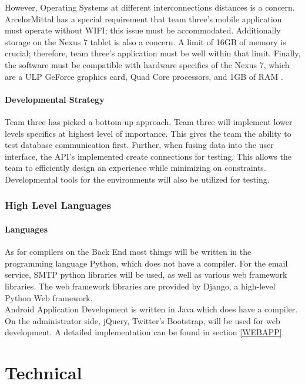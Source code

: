\documentclass[Letter,11pt]{article}
\begin{document}
	However, Operating Systems at different interconnections distances is a concern. ArcelorMittal has a special requirement that team three's mobile application must operate without WIFI; this issue must be accommodated. Additionally storage on the Nexus 7 tablet is also a concern. A limit of 16GB of memory is crucial; therefore, team three's application must be well within that limit.  Finally, the software must be compatible with hardware specifics of the Nexus 7, which are a ULP GeForce graphics card, Quad Core processors, and 1GB of RAM \cite{nexus7}. \\
	
	\subsection{Developmental Strategy}
	Team three has picked a bottom-up approach. Team three will implement lower levels specifics at highest level of importance. This gives the team the ability to test database communication first. Further, when fusing data into the user interface, the API's implemented create connections for testing. This allows the team to efficiently design an experience while minimizing on constraints. Developmental tools for the environments will also be utilized for testing. \\ 

\section{High Level Languages}\label{highlevel}
	\subsection{Languages}
	As for compilers on the Back End most things will be written in the programming language Python, which does not have a compiler. For the email service, SMTP python libraries will be used, as well as various web framework libraries. The web framework libraries are provided by Django, a high-level Python Web framework. \\
	Android Application Development is written in Java which does have a compiler. On the administrator side, jQuery, Twitter's Bootstrap, will be used for web development.  A detailed implementation can be found in section \ref{WEBAPP}.  \\ 


\part{Technical}
\end{document}
